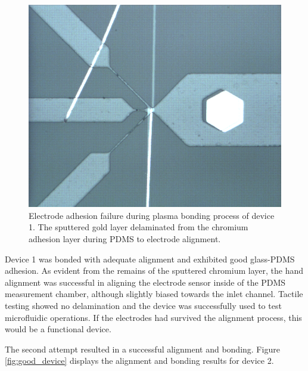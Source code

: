 \begin{figure}[h]
    \centering
    \includegraphics[width=\textwidth]{images/bad_device.png}
    \caption{Electrode adhesion failure during plasma bonding process of device 1. The sputtered gold layer delaminated from the chromium adhesion layer during PDMS to electrode alignment.}
    \label{fig:bad_device}
\end{figure}

\FloatBarrier

\par Device 1 was bonded with adequate alignment and exhibited good glass-PDMS adhesion. As evident from the remains of the sputtered chromium layer, the hand alignment was successful in aligning the electrode sensor inside of the PDMS measurement chamber, although slightly biased towards the inlet channel. Tactile testing showed no delamination and the device was successfully used to test microfluidic operations. If the electrodes had survived the alignment process, this would be a functional device. 

\par The second attempt resulted in a successful alignment and bonding. Figure \ref{fig:good_device} displays the alignment and bonding results for device 2. 

